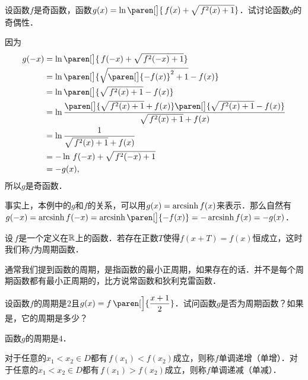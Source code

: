 \begin{example*}
  设函数\(f\)是奇函数，函数\(g(x) = \ln\paren[\big]{\,f(x) + \sqrt{\,f^2(x)+1}}\)．试讨论函数\(g\)的奇偶性．

  \begin{remark}
    因为
    \[
      \begin{split}
        g(-x)
        &= \ln\paren[\big]{\,f(-x) + \sqrt{\,f^2(-x)+1}} \\
        &= \ln\paren[\big]{\sqrt{\paren[\big]{-f(x)}^2+1} - f(x)} \\
        &= \ln\paren[\big]{\sqrt{\,f^2(x)+1} - f(x)} \\
        &= \ln{\frac{\paren[\big]{\sqrt{\,f^2(x)+1} + f(x)}\paren[\big]{\sqrt{\,f^2(x)+1} - f(x)}}{\sqrt{\,f^2(x)+1} + f(x)}} \\
        &= \ln \frac1{\sqrt{\,f^2(x)+1} + f(x)} \\
        &= -\ln{\,f(-x) + \sqrt{\,f^2(-x)+1}} \\
        &= -g(x),
      \end{split}
    \]
    所以\(g\)是奇函数．

    事实上，本例中的\(g\)和\(f\)的关系，可以用\(g(x) = \operatorname{arcsinh} f(x)\)来表示．那么自然有\(g(-x) = \arcsinh f(-x) = \arcsinh\paren[\big]{-f(x)} = - \arcsinh f(x) = -g(x)\)．
  \end{remark}
\end{example*}

\begin{definition*}
  设\(\,f\)是一个定义在\(\mathbb{R}\)上的函数．若存在正数\(T\)使得\(f(x+T) = f(x)\)恒成立，这时我们称\(f\)为周期函数．

  \begin{remark}
    通常我们提到函数的周期，是指函数的最小正周期，如果存在的话．并不是每个周期函数都有最小正周期的，比方说常函数和狄利克雷函数．
  \end{remark}
\end{definition*}

\begin{example*}
  设函数\(f\)的周期是\(2\)且\(g(x) = f\,\paren[\Big]{\dfrac{x+1}{2}}\)．试问函数\(g\)是否为周期函数？如果是，它的周期是多少？

  \begin{remark}
    函数\(g\)的周期是\(4\)．
  \end{remark}
\end{example*}

\begin{definition}
  \label{defn:funcmono}
  对于任意的\(x_1 < x_2 \in D\)都有\(\,f(x_1) < f(x_2)\)成立，则称\(f\)单调递增（单增）．对于任意的\(x_1 < x_2 \in D\)都有\(\,f(x_1) > f(x_2)\)成立，则称\(f\)单调递减（单减）．
\end{definition}

